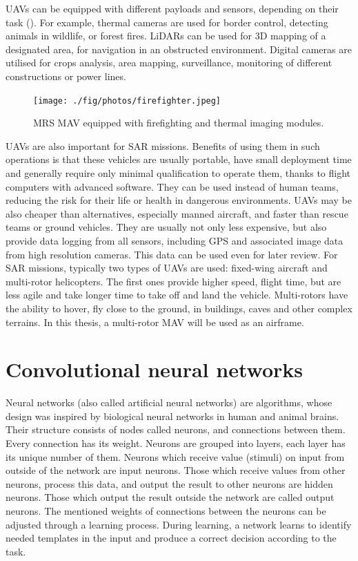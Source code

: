 \acs{UAV}s can be equipped with different payloads and sensors, depending on their task (). For example, thermal cameras are used for border control, detecting animals in wildlife, or forest fires. \acs{LiDAR}s can be used for 3D mapping of a designated area, for navigation in an obstructed environment. Digital cameras are utilised for crops analysis, area mapping, surveillance, monitoring of different constructions or power lines. 


\begin{figure}[!h]
  \centering
  \texttt{[image: ./fig/photos/firefighter.jpeg]}

  \caption{\acs{MRS} \acs{MAV} equipped with firefighting and thermal imaging modules.}
  \label{fig:firefighter}
\end{figure}


\acs{UAV}s are also important for \ac{SAR} missions. Benefits of using them in such operations is that these vehicles are usually portable, have small deployment time and generally require only minimal qualification to operate them, thanks to flight computers with advanced software. They can be used instead of human teams, reducing the risk for their life or health in dangerous environments. \acs{UAV}s may be also cheaper than alternatives, especially manned aircraft, and faster than rescue teams or ground vehicles. They are usually not only less expensive, but also provide data logging from all sensors, including \acs{GPS} and associated image data from high resolution cameras. This data can be used even for later review. For \acs{SAR} missions, typically two types of \acs{UAV}s are used: fixed-wing aircraft and multi-rotor helicopters. The first ones provide higher speed, flight time, but are less agile and take longer time to take off and land the vehicle. Multi-rotors have the ability to hover, fly close to the ground, in buildings, caves and other complex terrains. In this thesis, a multi-rotor \acs{MAV} will be used as an airframe. 


\section{Convolutional neural networks}

Neural networks (also called artificial neural networks) are algorithms, whose design was inspired by biological neural networks in human and animal brains. Their structure consists of nodes called neurons, and connections between them. Every connection has its weight. Neurons are grouped into layers, each layer has its unique number of them. Neurons which receive value (stimuli) on input from outside of the network are input neurons. Those which receive values from other neurons, process this data, and output the result to other neurons are hidden neurons. Those which output the result outside the network are called output neurons. The mentioned weights of connections between the neurons can be adjusted through a learning process. During learning, a network learns to identify needed templates in the input and produce a correct decision according to the task. 

